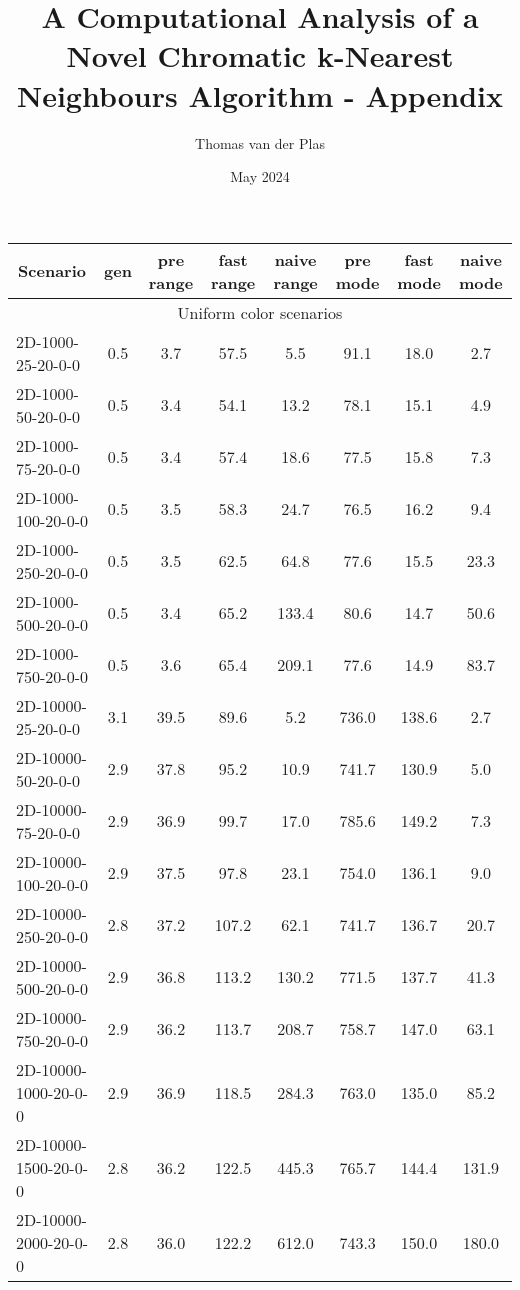 \documentclass{article}
\title{A Computational Analysis of a Novel Chromatic k-Nearest Neighbours Algorithm - Appendix}
\author{Thomas van der Plas}
\date{May 2024}
\begin{document}
\maketitle
{}
\begin{center}
\begin{table}[h]
    \hskip0.8cm
    \begin{tabular}{|l||c|c|c|c|c|c|c|}
    \hline
    \multicolumn{1}{|c|}{Scenario} & gen & pre range & fast range & naive range & pre mode & fast mode & naive mode  \\
    \hline
    \hline
    \multicolumn{8}{|c|}{Uniform color scenarios} \\
    \hline
    2D-1000-25-20-0-0 & 0.5 & 3.7 & 57.5 & 5.5 & 91.1 & 18.0 & 2.7 \\
    2D-1000-50-20-0-0 & 0.5 & 3.4 & 54.1 & 13.2 & 78.1 & 15.1 & 4.9 \\
    2D-1000-75-20-0-0 & 0.5 & 3.4 & 57.4 & 18.6 & 77.5 & 15.8 & 7.3 \\
    2D-1000-100-20-0-0 & 0.5 & 3.5 & 58.3 & 24.7 & 76.5 & 16.2 & 9.4 \\
    2D-1000-250-20-0-0 & 0.5 & 3.5 & 62.5 & 64.8 & 77.6 & 15.5 & 23.3 \\
    2D-1000-500-20-0-0 & 0.5 & 3.4 & 65.2 & 133.4 & 80.6 & 14.7 & 50.6 \\
    2D-1000-750-20-0-0 & 0.5 & 3.6 & 65.4 & 209.1 & 77.6 & 14.9 & 83.7 \\
    \hline
    2D-10000-25-20-0-0 & 3.1 & 39.5 & 89.6 & 5.2 & 736.0 & 138.6 & 2.7 \\
    2D-10000-50-20-0-0 & 2.9 & 37.8 & 95.2 & 10.9 & 741.7 & 130.9 & 5.0 \\
    2D-10000-75-20-0-0 & 2.9 & 36.9 & 99.7 & 17.0 & 785.6 & 149.2 & 7.3 \\
    2D-10000-100-20-0-0 & 2.9 & 37.5 & 97.8 & 23.1 & 754.0 & 136.1 & 9.0 \\
    2D-10000-250-20-0-0 & 2.8 & 37.2 & 107.2 & 62.1 & 741.7 & 136.7 & 20.7 \\
    2D-10000-500-20-0-0 & 2.9 & 36.8 & 113.2 & 130.2 & 771.5 & 137.7 & 41.3 \\
    2D-10000-750-20-0-0 & 2.9 & 36.2 & 113.7 & 208.7 & 758.7 & 147.0 & 63.1 \\
    2D-10000-1000-20-0-0 & 2.9 & 36.9 & 118.5 & 284.3 & 763.0 & 135.0 & 85.2 \\
    2D-10000-1500-20-0-0 & 2.8 & 36.2 & 122.5 & 445.3 & 765.7 & 144.4 & 131.9 \\
    2D-10000-2000-20-0-0 & 2.8 & 36.0 & 122.2 & 612.0 & 743.3 & 150.0 & 180.0 \\

\end{tabular}
\end{table}
\end{center}
\end{document}
